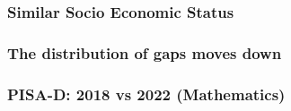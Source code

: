 \documentclass{beamer}
\begin{document}
\begin{frame}
    \label{update_scott}
    \frametitle{Similar Socio Economic Status}
        {
    }
\end{frame}


\begin{frame}
    \label{update_scott}
    \frametitle{The distribution of gaps moves down}
        {
    }
\end{frame}

\begin{frame}
    \label{update_scott}
    \frametitle{PISA-D: 2018 vs 2022 (Mathematics)}
        {
    }
\end{frame}
\end{document}

